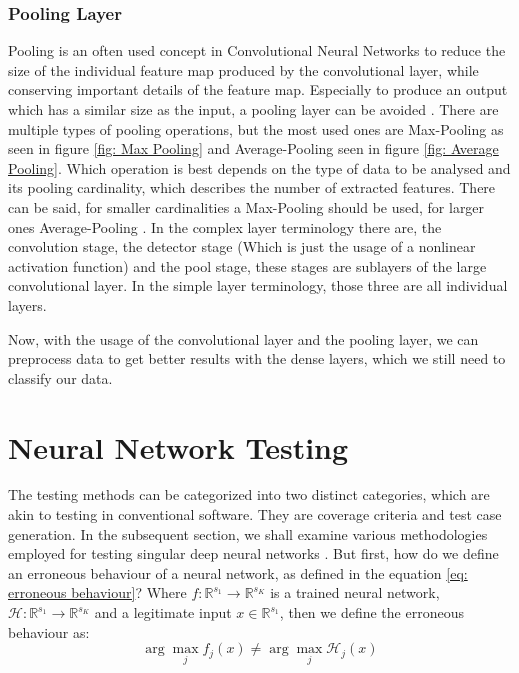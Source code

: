 \subsubsection{Pooling Layer}
Pooling is an often used concept in Convolutional Neural Networks to reduce the size of the individual feature map produced by the convolutional layer, while conserving important details of the feature map.
Especially to produce an output which has a similar size as the input, a pooling layer can be avoided \cite{jain_supervised_2007}.
There are multiple types of pooling operations, but the most used ones are Max-Pooling as seen in figure \ref{fig: Max Pooling} and Average-Pooling seen in figure \ref{fig: Average Pooling}.
Which operation is best depends on the type of data to be analysed and its pooling cardinality, which describes the number of extracted features.
There can be said, for smaller cardinalities a Max-Pooling should be used, for larger ones Average-Pooling \cite{boureau_theoretical_2010}.
In the complex layer terminology \cite{goodfellow_deep_2016} there are, the convolution stage, the detector stage (Which is just the usage of a nonlinear activation function) and the pool stage, these stages are sublayers of the large convolutional layer.
In the simple layer terminology, those three are all individual layers.


Now, with the usage of the convolutional layer and the pooling layer, we can preprocess data to get better results with the dense layers, which we still need to classify our data.


\section{Neural Network Testing}\label{sec:neural-network-testing}
The testing methods can be categorized into two distinct categories, which are akin to testing in conventional software.
They are coverage criteria and test case generation.
In the subsequent section, we shall examine various methodologies employed for testing singular deep neural networks \cite{huang_survey_2020}.
But first, how do we define an erroneous behaviour of a neural network, as defined in the equation \ref{eq: erroneous behaviour}?
Where $f: \mathbb{R}^{s_1} \to \mathbb{R}^{s_K}$ is a trained neural network, $\mathcal{H}: \mathbb{R}^{s_1} \to \mathbb{R}^{s_K}$ and a legitimate input $x \in \mathbb{R}^{s_1}$, then we define the erroneous behaviour as:
\begin{equation}
    \arg \max_{j} f_j (x) \neq \arg \max_{j} \mathcal{H}_j (x)
    \label{eq: erroneous behaviour}
\end{equation}

